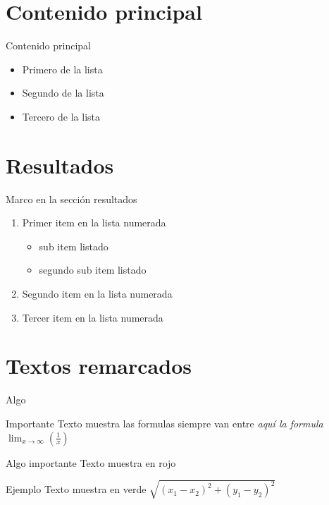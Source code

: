 \documentclass[spanish]{beamer}
\begin{document}
\section{Contenido principal}
\begin{frame}{Contenido principal}

\begin{itemize}
\item Primero de la lista
\item Segundo de la lista
\item Tercero de la lista
\end{itemize}
\end{frame}



\section{Resultados}
\begin{frame}{Marco en la sección resultados}

\begin{enumerate}
\item Primer item en la lista numerada

\begin{itemize}
\item sub item listado
\item segundo sub item listado
\end{itemize}
\item Segundo item en la lista numerada
\item Tercer item en la lista numerada
\end{enumerate}
\end{frame}



\section{Textos remarcados}
\begin{frame}{Algo}




\begin{block}{Importante} 
Texto muestra las formulas siempre van entre \textit{aquí la formula}
$\lim_{x \to \infty} \left( \frac{1}{x} \right)$
\end{block}

\begin{alertblock}{Algo importante} 
Texto muestra en rojo 
\end{alertblock}

\begin{exampleblock}{Ejemplo} 
Texto muestra en verde
$\sqrt{(x_1 - x_2)^2 + (y_1 - y_2)^2}$
\end{exampleblock}

\end{frame}
\end{document}
